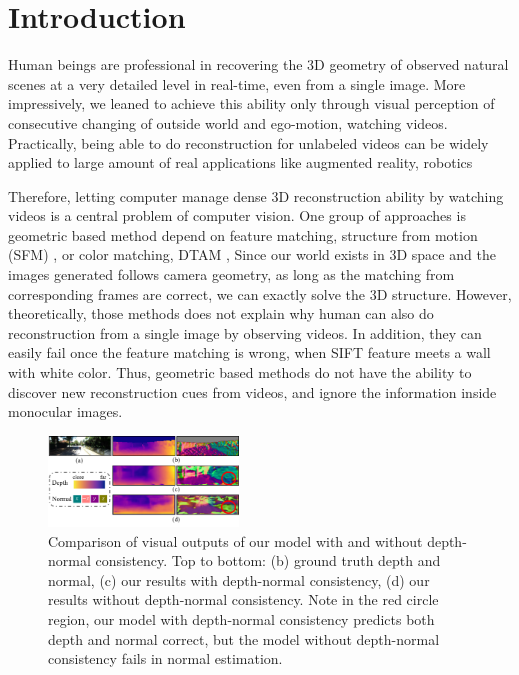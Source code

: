 
\vspace{-1.0\baselineskip}
\section{Introduction}
\label{sec:intro}
\vspace{-0.3\baselineskip}

Human beings are professional in recovering the 3D geometry of observed natural scenes at a very detailed level in real-time, even from a single image. 
More impressively, we leaned to achieve this ability only through visual perception of consecutive changing of outside world and ego-motion, \ie watching videos. 
Practically, being able to do reconstruction for unlabeled videos can be widely applied to large amount of real applications like augmented reality, robotics \etc

Therefore, letting computer manage dense 3D reconstruction ability by watching videos is a central problem of computer vision. 
One group of approaches is geometric based method depend on feature matching, \eg structure from motion (SFM) \cite{wu2011visualsfm} \etc, or color matching, \eg DTAM \cite{NewcombeLD11}, \etc  Since our world exists in 3D space and the images generated follows camera geometry, as long as the matching from corresponding frames are correct, we can exactly solve the 3D structure. 
However, theoretically, those methods does not explain why human can also do reconstruction from a single image by observing videos. In addition, they can easily fail once the feature matching is wrong, \eg when SIFT \cite{lowe2004distinctive}  feature meets a wall with white color. 
Thus, geometric based methods do not have the ability to discover new reconstruction cues from videos, and ignore the information inside monocular images.

\begin{figure}
\centering
\includegraphics[width=0.45\textwidth]{figures/visual_comparison_comp.pdf}
\caption{Comparison of visual outputs of our model with and without depth-normal consistency. Top to bottom: (b) ground truth depth and normal, (c) our results with depth-normal consistency, (d) our results without depth-normal consistency. Note in the red circle region, our model with depth-normal consistency predicts both depth and normal correct, but the model without depth-normal consistency fails in normal estimation.}
\label{fig:visual_comparison}
\end{figure}

